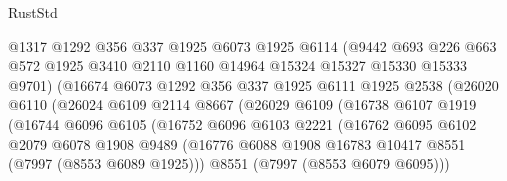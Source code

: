 \begin{lexlean}{RustStd}
\begin{coremodule}
                          @1317
                          @1292
                          @356
                          @337
                          @1925
                          @6073
                          @1925
                          @6114
                          (@9442
                            @693
                            @226
                            @663
                            @572
                            @1925
                            @3410
                            @2110
                            @1160
                            @14964
                            @15324
                            @15327
                            @15330
                            @15333
                            @9701)
                          (@16674
                            @6073
                            @1292
                            @356
                            @337
                            @1925
                            @6111
                            @1925
                            @2538
                            (@26020
                              @6110
                              (@26024
                                @6109
                                @2114
                                @8667
                                (@26029
                                  @6109
                                  (@16738
                                    @6107
                                    @1919
                                    (@16744
                                      @6096
                                      @6105
                                      (@16752
                                        @6096
                                        @6103
                                        @2221
                                        (@16762
                                          @6095
                                          @6102
                                          @2079
                                          @6078
                                          @1908
                                          @9489
                                          (@16776
                                            @6088
                                            @1908
                                            @16783
                                            @10417
                                            @8551
                                            (@7997 (@8553 @6089 @1925)))
                                          @8551
                                          (@7997 (@8553 @6079 @6095)))

\end{coremodule}
\end{lexlean}
